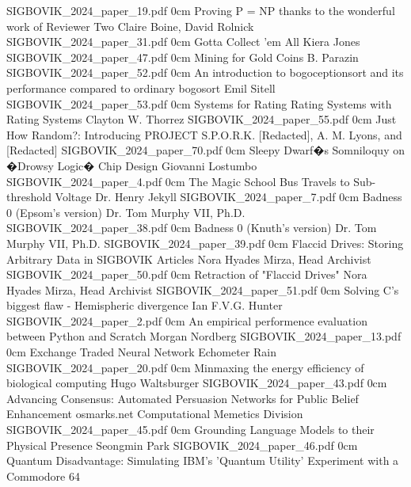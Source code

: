 	{}
	{SIGBOVIK_2024_paper_19.pdf}
	{0cm}
	{}
\addpaper
	{Proving P = NP thanks to the wonderful work of Reviewer Two}
	{Claire Boine, David Rolnick}
	{}
	{SIGBOVIK_2024_paper_31.pdf}
	{0cm}
	{}
\addpaper
	{Gotta Collect 'em All}
	{Kiera Jones}
	{}
	{SIGBOVIK_2024_paper_47.pdf}
	{0cm}
	{}
\addpaper
	{Mining for Gold Coins}
	{B. Parazin}
	{}
	{SIGBOVIK_2024_paper_52.pdf}
	{0cm}
	{}
\addpaper
	{An introduction to bogoceptionsort and its performance compared to ordinary bogosort}
	{Emil Sitell}
	{}
	{SIGBOVIK_2024_paper_53.pdf}
	{0cm}
	{}
\addpaper
	{Systems for Rating Rating Systems with Rating Systems}
	{Clayton W. Thorrez}
	{}
	{SIGBOVIK_2024_paper_55.pdf}
	{0cm}
	{}
\addpaper
	{Just How Random?: Introducing PROJECT S.P.O.R.K.}
	{[Redacted], A. M. Lyons, and [Redacted]}
	{}
	{SIGBOVIK_2024_paper_70.pdf}
	{0cm}
	{}
\addpaper
	{Sleepy Dwarf�s Somniloquy on �Drowsy Logic� Chip Design}
	{Giovanni Lostumbo}
	{}
	{SIGBOVIK_2024_paper_4.pdf}
	{0cm}
	{}
\addpaper
	{The Magic School Bus Travels to Sub-threshold Voltage}
	{Dr. Henry Jekyll}
	{}
	{SIGBOVIK_2024_paper_7.pdf}
	{0cm}
	{}
\addpaper
	{Badness 0 (Epsom's version)}
	{Dr. Tom Murphy VII, Ph.D.}
	{}
	{SIGBOVIK_2024_paper_38.pdf}
	{0cm}
	{}
\addpaper
	{Badness 0 (Knuth's version)}
	{Dr. Tom Murphy VII, Ph.D.}
	{}
	{SIGBOVIK_2024_paper_39.pdf}
	{0cm}
	{}
\addpaper
	{Flaccid Drives: Storing Arbitrary Data in SIGBOVIK Articles}
	{Nora Hyades Mirza, Head Archivist}
	{}
	{SIGBOVIK_2024_paper_50.pdf}
	{0cm}
	{}
\addpaper
	{Retraction of "Flaccid Drives"}
	{Nora Hyades Mirza, Head Archivist}
	{}
	{SIGBOVIK_2024_paper_51.pdf}
	{0cm}
	{}
\addpaper
	{Solving C's biggest flaw - Hemispheric divergence}
	{Ian F.V.G. Hunter}
	{}
	{SIGBOVIK_2024_paper_2.pdf}
	{0cm}
	{}
\addpaper
	{An empirical performence evaluation between Python and Scratch}
	{Morgan Nordberg}
	{}
	{SIGBOVIK_2024_paper_13.pdf}
	{0cm}
	{}
\addpaper
	{Exchange Traded Neural Network}
	{Echometer Rain}
	{}
	{SIGBOVIK_2024_paper_20.pdf}
	{0cm}
	{}
\addpaper
	{Minmaxing the energy efficiency of biological computing}
	{Hugo Waltsburger}
	{}
	{SIGBOVIK_2024_paper_43.pdf}
	{0cm}
	{}
\addpaper
	{Advancing Consensus: Automated Persuasion Networks for Public Belief Enhancement}
	{osmarks.net Computational Memetics Division}
	{}
	{SIGBOVIK_2024_paper_45.pdf}
	{0cm}
	{}
\addpaper
	{Grounding Language Models to their Physical Presence}
	{Seongmin Park}
	{}
	{SIGBOVIK_2024_paper_46.pdf}
	{0cm}
	{}
\addpaper
	{Quantum Disadvantage: Simulating IBM's 'Quantum Utility' Experiment with a Commodore 64}
